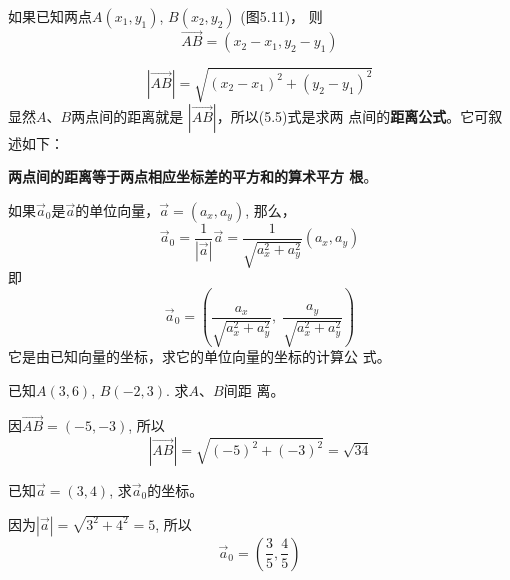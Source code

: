 如果已知两点$A(x_1,y_1)$, $B(x_2,y_2)$ (图5.11)，
则
\[\Vec{AB}=(x_2-x_1,y_2-y_1)\]

\begin{figure}[htp]
    \centering
{}
    \caption{}
\end{figure}


\begin{equation}
    |\Vec{AB}|=\sqrt{(x_2-x_1)^2+(y_2-y_1)^2}
\end{equation}
显然$A$、$B$两点间的距离就是
$|\Vec{AB}|$，所以(5.5)式是求两
点间的\textbf{距离公式}。它可叙述如下：

\textbf{两点间的距离等于两点相应坐标差的平方和的算术平方
根}。

如果$\vec{a}_0$是$\vec{a}$的单位向量，$\vec{a}=(a_x,a_y)$, 
那么，
\[\vec{a}_0=\frac{1}{|\vec{a}|}\vec{a}=\frac{1}{\sqrt{a^2_x+a^2_y}}(a_x,a_y)\]
即
\begin{equation}
    \vec{a}_0=\left(\frac{a_x}{\sqrt{a^2_x+a^2_y}},\; \frac{a_y}{\sqrt{a^2_x+a^2_y}}\right)
\end{equation}
它是由已知向量的坐标，求它的单位向量的坐标的计算公
式。

\begin{example}
    已知$A(3,6)$, $B(-2,3)$. 求$A$、$B$间距
离。
\end{example}

\begin{solution}
    因$\Vec{AB}=(-5,-3)$, 所以
\[|\Vec{AB}|=\sqrt{(-5)^2+(-3)^2}=\sqrt{34}\]
\end{solution}


\begin{example}
    已知$\vec{a}=(3,4)$, 求$\vec{a}_0$的坐标。
\end{example}

\begin{solution}
因为$|\vec{a}|=\sqrt{3^2+4^2}=5$, 所以
\[\vec{a}_0=\left(\frac{3}{5},\frac{4}{5}\right)\]
\end{solution}

